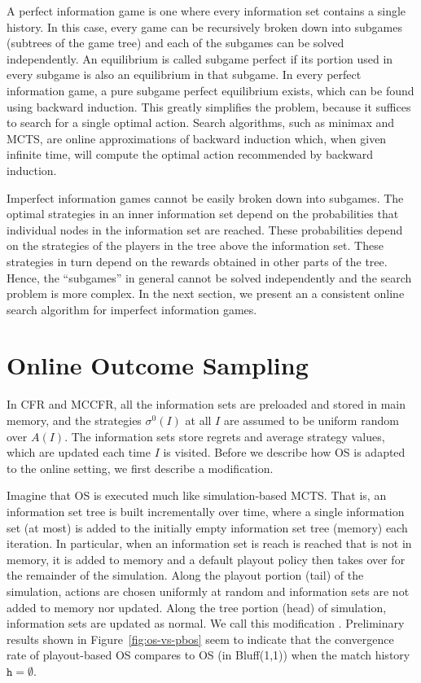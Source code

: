 \documentclass[letterpaper]{article}
\newcommand{\tth}{\mathtt{h}}
\newcommand{\defword}[1]{\textbf{\boldmath{#1}}}
\begin{document}
A perfect information game is one where every information set contains a single history. In this case, every game can be recursively broken down into 
subgames (subtrees of the game tree) and each of the subgames can be solved independently. An equilibrium is called subgame perfect if its portion 
used in every subgame is also an equilibrium in that 
subgame. In every perfect information game, a pure subgame perfect equilibrium exists, which can be found using backward induction. 
This greatly simplifies the problem, because it suffices to search for a single optimal action. 
Search algorithms, such as minimax and MCTS, are online approximations of backward induction which, when given infinite time,
will compute the optimal action recommended by backward induction. 

Imperfect information games cannot be easily broken down into subgames. The optimal strategies in an inner information set depend on the 
probabilities that individual nodes in the information set are reached. These probabilities depend on the strategies of the players in
the tree above the information set. These strategies in turn depend on the rewards obtained in other parts of the tree. Hence, the 
``subgames'' in general cannot be solved independently and the search problem is more complex. In the next section, 
we present an a consistent online search algorithm for imperfect information games. 

\section{Online Outcome Sampling}


In CFR and MCCFR, all the information sets are preloaded and stored in main memory, and
the strategies $\sigma^0(I)$ at all $I$ are assumed to be uniform random over $A(I)$. The information sets store regrets and average strategy 
values, which are updated each time $I$ is visited. Before we describe how OS is adapted to the online setting, we first describe
a modification.

Imagine that OS is executed much like simulation-based MCTS. That is, an information set tree is built incrementally over 
time, where a single information set (at most) is added to the initially empty information set tree (memory) each iteration. In 
particular, when an information set is reach is reached that is not in memory, it is added to memory and a default playout policy then takes 
over for the remainder of the simulation. Along the playout portion (tail) of the simulation, actions are chosen uniformly at random and 
information sets are not added to memory nor updated. Along the tree portion (head) of simulation, information sets are updated as normal. 
We call this modification \defword{playout-based outcome sampling}. Preliminary results shown in Figure~\ref{fig:os-vs-pbos} seem to indicate that the convergence rate of playout-based OS compares to OS (in Bluff(1,1)) when the match history $\tth = \emptyset$. 
\end{document}
